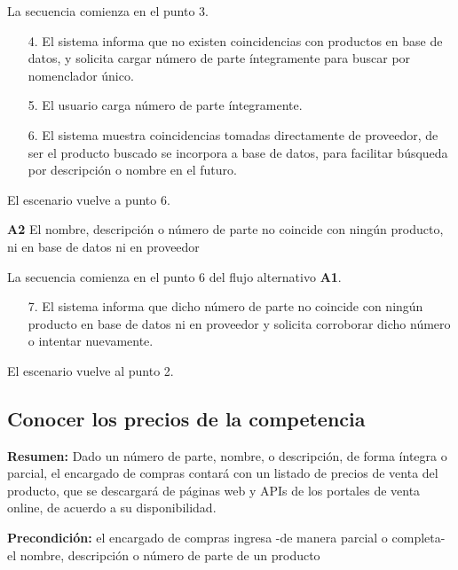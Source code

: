 La secuencia comienza en el punto 3.

\begin{enumerate}
	\item[4.] El sistema informa que no existen coincidencias con productos en base de datos,
	y solicita cargar número de parte íntegramente para buscar por nomenclador único.
	\item[5.] El usuario carga número de parte íntegramente.
	\item[6.] El sistema muestra coincidencias tomadas directamente de proveedor,
	de ser el producto buscado se incorpora a base de datos,
	para facilitar búsqueda por descripción o nombre en el futuro.
\end{enumerate}

El escenario vuelve a punto 6.

\textbf{A2} El nombre, descripción o número de parte no coincide con ningún producto, ni en base de datos ni en proveedor

La secuencia comienza en el punto 6 del flujo alternativo \textbf{A1}.

\begin{enumerate}
	\item [7.] El sistema informa que dicho número de parte no coincide con ningún producto en base de datos ni en proveedor y solicita corroborar dicho número o intentar nuevamente.
\end{enumerate}

El escenario vuelve al punto 2.

\pagebreak

\subsection{Conocer los precios de la competencia}

\textbf{Resumen:}
Dado un número de parte, nombre, o descripción,
de forma íntegra o parcial,
el encargado de compras contará con un listado de precios de venta del producto,
que se descargará de páginas web y APIs de los portales de venta online,
de acuerdo a su disponibilidad.

\textbf{Precondición:} 
el encargado de compras ingresa -de manera parcial o completa- el nombre, descripción o número de parte de un producto


